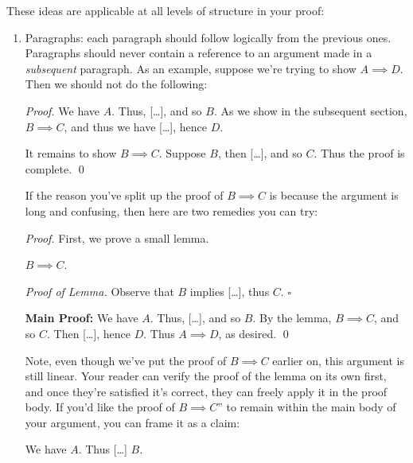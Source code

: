 \documentclass{fkpset}
\begin{document}
These ideas are applicable at all levels of structure in your proof:
\begin{enumerate}[label=(\arabic*)]
  \item Paragraphs: each paragraph should follow logically from the previous
    ones. Paragraphs should never contain a reference to an argument made in a
    \emph{subsequent} paragraph. As an example, suppose we're trying to show $A
    \implies D$. Then we should not do the following:
    \begin{leftbar}\emph{Proof.}
      We have $A$. Thus, [\ldots], and so $B$. As we show in the subsequent
      section, $B \implies C$, and thus we have [\ldots], hence $D$.

      It remains to show $B \implies C$. Suppose $B$, then [\ldots], and so $C$.
      Thus the proof is complete. \qed
    \end{leftbar}
    If the reason you've split up the proof of $B \implies C$ is because the
    argument is long and confusing, then here are two remedies you can try:
    \begin{leftbar}
      \emph{Proof.} First, we prove a small lemma.
      \begin{leftbar}\vspace{.5em}
        \begin{lemma}
          $B \implies C$.
        \end{lemma}
        \emph{Proof of Lemma.} Observe that $B$ implies [\ldots], thus $C$.
        \hfill $\square$
      \end{leftbar}
      \textbf{Main Proof:}
      We have $A$. Thus, [\ldots], and so $B$. By the lemma, $B \implies C$, and
      so $C.$ Then [\ldots], hence $D$. Thus $A \implies D$, as desired. \qed
    \end{leftbar}
    Note, even though we've put the proof of $B \implies C$ earlier on, this
    argument is still linear. Your reader can verify the proof of the lemma on
    its own first, and once they're satisfied it's correct, they can freely
    apply it in the proof body. If you'd like the proof of $B \implies C$'' to
    remain within the main body of your argument, you can frame it as a claim:
    \begin{leftbar}
      We have $A$. Thus [\ldots] $B$.

\end{leftbar}
\end{enumerate}
\end{document}
